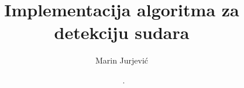 


%




\frontmatter   %



\title{Implementacija algoritma za detekciju sudara}   %

\date{\MONTH~\the\year.}   %

\author{Marin Jurjević}  %
\maketitle		%
\maketitleabstract
\begin{assignmentpage}
\end{assignmentpage}

\begin{honestystatementpage}
	
\end{honestystatementpage}

\begin{acknowledgments} %
	  
\end{acknowledgments}

\tableofcontents
\listoffigures
\clearpage
{}
\lstlistoflistings

